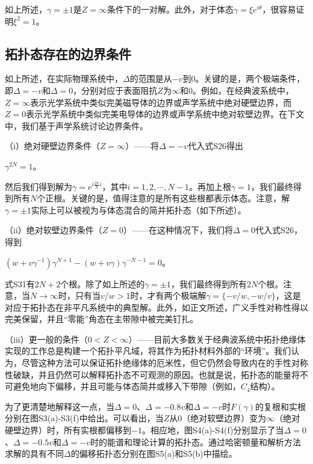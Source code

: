 如上所述，\(\gamma=\pm1\)是\(Z=\infty\)条件下的一对解。此外，对于体态\(\gamma=\xi e^{i\theta}\)，很容易证明\(\xi^{2}=1\)。

\subsection{拓扑态存在的边界条件}

如上所述，在实际物理系统中，\(\Delta\)的范围是从\(-v\)到\(0\)。关键的是，两个极端条件，即\(\Delta = -v\)和\(\Delta = 0\)，分别对应于表面阻抗\(Z\)为\(\infty\)和\(0\)。例如，在经典波系统中，\(Z=\infty\)表示光学系统中类似完美磁导体的边界或声学系统中绝对硬壁边界，而\(Z = 0\)表示光学系统中类似完美电导体的边界或声学系统中绝对软壁边界。在下文中，我们基于声学系统讨论边界条件。

（i）绝对硬壁边界条件（\(Z=\infty\)）——将\(\Delta = -v\)代入式S26得出

\(\gamma^{2N}=1\)。

然后我们得到解为\(\gamma = e^{i\frac{2\pi}{N}i}\)，其中\(i = 1,2,\cdots,N - 1\)。再加上根\(\gamma = 1\)，我们最终得到所有\(N\)个正根。关键的是，值得注意的是所有这些根都表示体态。注意，解\(\gamma=\pm1\)实际上可以被视为与体态混合的简并拓扑态（如下所述）。

（ii）绝对软壁边界条件（\(Z = 0\)）——在这种情况下，我们将\(\Delta = 0\)代入式S26，得到

\((w + v\gamma^{-1})\gamma^{N + 1}-(w + v\gamma)\gamma^{-N - 1}=0\)。

式S31有\(2N + 2\)个根。除了如上所述的\(\gamma=\pm1\)，我们最终得到所有\(2N\)个根。注意，当\(N\rightarrow\infty\)时，只有当\(v/w > 1\)时，才有两个极端解\(\gamma = \{-v/w, -w/v\}\)，这是对应于拓扑态在非平凡系统中的典型解。此外，如正文所述，广义手性对称性得以完美保留，并且“零能”角态在主带隙中被完美钉扎。

（iii）更一般的条件（\(0 < Z < \infty\)）——目前大多数关于经典波系统中拓扑绝缘体实现的工作总是构建一个拓扑平凡域，将其作为拓扑材料外部的“环境”。我们认为，尽管这种方法可以保证拓扑绝缘体的厄米性，但它仍然会导致内在的手性对称性破缺，并且仍然可以解释拓扑态不可观测的原因。也就是说，拓扑态的能量将不可避免地向下偏移，并且可能与体态简并或移入下带隙（例如，\(C_{4}\)结构）。

为了更清楚地解释这一点，当\(\Delta = 0\)、\(\Delta = -0.8v\)和\(\Delta = -v\)时\(F(\gamma)\)的复根和实根分别在图S3(a)-S3(f)中给出。可以看出，当\(Z\)从\(0\)（绝对软壁边界）变为\(\infty\)（绝对硬壁边界）时，所有实根都偏移到\(-1\)。相应地，图S4(a)-S4(f)分别显示了当\(\Delta = 0\)、\(\Delta = -0.5v\)和\(\Delta = -v\)时的能谱和理论计算的拓扑态。通过哈密顿量和解析方法求解的具有不同\(\Delta\)的偏移拓扑态分别在图S5(a)和S5(b)中描绘。

